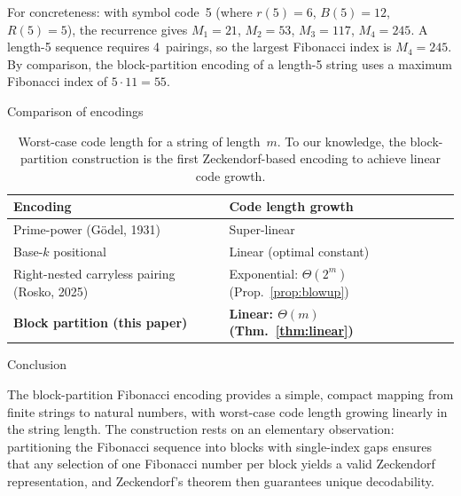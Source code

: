 \documentclass[11pt]{amsart}
\makeatletter
\renewcommand{\section}{\@startsection{section}{1}%
  \z@{.7\linespacing\@plus\linespacing}{.5\linespacing}%
  {\normalfont\bfseries}}
\theoremstyle{plain}
\theoremstyle{definition}
\theoremstyle{remark}
\makeatother
\begin{document}
For concreteness: with symbol code~5 (where $r(5)=6$, $B(5)=12$, $R(5)=5$), the recurrence gives $M_1=21$, $M_2=53$, $M_3=117$, $M_4=245$. A length-5 sequence requires 4~pairings, so the largest Fibonacci index is $M_4=245$. By comparison, the block-partition encoding of a length-5 string uses a maximum Fibonacci index of $5 \cdot 11 = 55$.


\section{Comparison of encodings}

\begin{table}[ht]
\centering
\begin{tabular}{ll}
\toprule
\textbf{Encoding} & \textbf{Code length growth} \\
\midrule
Prime-power (G\"odel, 1931) & Super-linear \\
Base-$k$ positional & Linear (optimal constant) \\
Right-nested carryless pairing (Rosko, 2025) & Exponential: $\Theta(2^m)$ (Prop.~\ref{prop:blowup}) \\
\textbf{Block partition (this paper)} & \textbf{Linear: $\Theta(m)$ (Thm.~\ref{thm:linear})} \\
\bottomrule
\end{tabular}

\vspace{1em}
\caption{Worst-case code length for a string of length~$m$. To our knowledge, the block-partition construction is the first Zeckendorf-based encoding to achieve linear code growth.}
\label{tab:comparison}
\end{table}


\section{Conclusion}

The block-partition Fibonacci encoding provides a simple, compact mapping from finite strings to natural numbers, with worst-case code length growing linearly in the string length. The construction rests on an elementary observation: partitioning the Fibonacci sequence into blocks with single-index gaps ensures that any selection of one Fibonacci number per block yields a valid Zeckendorf representation, and Zeckendorf's theorem then guarantees unique decodability.
\end{document}
